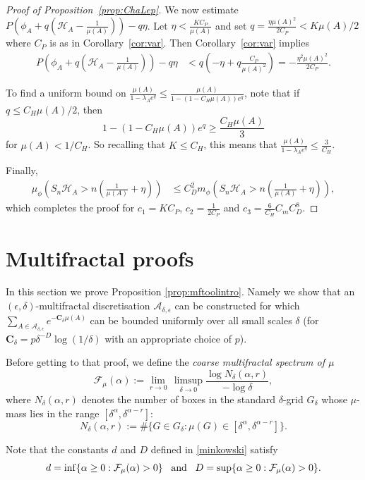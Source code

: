 \documentclass[11pt, reqno]{amsart}
\numberwithin{equation}{section}
\theoremstyle{plain}%
\theoremstyle{definition}
\def\A{\ensuremath{\mathscr A}}
\renewcommand{\H}{\mathcal{H}}
\renewcommand{\A}{\mathcal{A}}
\theoremstyle{nonumberplain}
\begin{document}
\begin{proof}[Proof of Proposition~\ref{prop:ChaLep}]
We now estimate $P\left(\phi_A+q\left(\H_A-\frac{1}{\mu(A)}\right)\right)-q\eta$.
Let $\eta<\frac{KC_P}{\mu(A)}$ and set $q=\frac{\eta \mu(A)^2}{2C_P}<K\mu(A)/2$ where $C_P$ is as in Corollary~\ref{cor:var}.  Then Corollary~\ref{cor:var} implies 
\begin{align*}
P\left(\phi_A+q\left(\H_A-\frac{1}{\mu(A)}\right)\right)-q \eta& <q\left(-\eta+ q\frac{C_P}{\mu(A)^2}\right)=-\frac{\eta^2 \mu(A)^2}{2C_P}.
\end{align*}

To find a uniform bound on $\frac{\mu(A)}{1-\lambda_Ae^q}\le \frac{\mu(A)}{1-(1-C_H\mu(A))e^q}$, note that if $q\le C_H\mu(A)/2$, then 
$$1-(1-C_H\mu(A))e^q\ge  \frac{C_H\mu(A)}3 $$
for $\mu(A)<1/C_H$.   So recalling that $K\le C_H$, this means that $\frac{\mu(A)}{1-\lambda_Ae^q}\le \frac3{C_H}$.

Finally,
\begin{align*}
\mu_\phi\left(S_n\H_A>n\left(\frac1{\mu(A)}+\eta\right)\right) &\leq  C_D^2 m_\phi\left(S_n\H_A>n\left(\frac1{\mu(A)}+\eta\right)\right),
\end{align*}
which completes the proof for $c_1=KC_P$, $c_2= \frac1{2C_P}$ and $c_3 = \frac6{C_H}C_mC_D^8$.
\end{proof}  


\section{Multifractal proofs}\label{mfsection}


In this section we prove Proposition \ref{prop:mftoolintro}. Namely we show that an $(\epsilon, \delta)$-multifractal discretisation $\A_{\delta,\epsilon}$ can be constructed for which $\sum_ {A\in \A_{\delta,\epsilon}} e^{-\mathbf{C}_\delta\mu(A)}$ can be bounded uniformly over all small scales $\delta$ (for $\mathbf{C}_\delta=p\delta^{-D}\log(1/\delta)$ with an appropriate choice of $p$).

Before getting to that proof, we define the
\emph{coarse multifractal spectrum of $\mu$}
\[
\mathcal{F}_\mu(\alpha)
   := \lim_{r \to 0}\,
     \limsup_{\delta \to 0}
     \frac{\log N_\delta(\alpha,r)}{-\log \delta},
\]
where $N_\delta(\alpha,r)$ denotes the number of boxes in the standard
$\delta$-grid $G_\delta$ whose $\mu$-mass lies in the range $[\delta^\alpha,\delta^{\alpha-r}] $:
\[
N_\delta(\alpha,r)
   := \#\bigl\{ G\in G_\delta :
        \mu(G)\in[\delta^\alpha,\delta^{\alpha-r}] \bigr\}.
\]

Note that the constants $d$ and $D$ defined in \eqref{minkowski} satisfy
\[
d=\inf\{\alpha\ge0 : \mathcal{F}_\mu(\alpha)>0\} \;\; \;\textnormal{and} \;\;\; D=\sup\{\alpha\ge0 : \mathcal{F}_\mu(\alpha)>0\}.
\]
\end{document}
